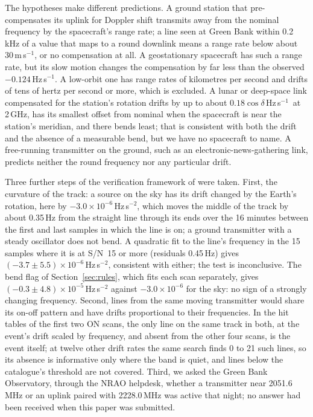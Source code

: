 \documentclass[twocolumn]{aastex631}
\newcommand{\hzs}{Hz\,s$^{-1}$}
\newcommand{\sn}{S/N}
\begin{document}
The hypotheses make different predictions. A ground station that
pre-compensates its uplink for Doppler shift transmits away from the
nominal frequency by the spacecraft's range rate; a line seen at Green Bank
within 0.2\,kHz of a value that maps to a round downlink means a range rate
below about 30\,m\,s$^{-1}$, or no compensation at all. A geostationary
spacecraft has such a range rate, but its slow motion changes the
compensation by far less than the observed $-0.124$\,\hzs. A low-orbit one
has range rates of kilometres per second and drifts of tens of hertz per
second or more, which is excluded. A lunar or deep-space link compensated
for the station's rotation drifts by up to about $0.18\cos\delta$\,\hzs\
at 2\,GHz, has its smallest offset from nominal when the spacecraft is near
the station's meridian, and there bends least; that is consistent with both
the drift and the absence of a measurable bend, but we have no spacecraft
to name. A free-running transmitter on the ground, such as an
electronic-news-gathering link, predicts neither the round frequency nor
any particular drift.

Three further steps of the verification framework of \citet{Sheikh2021}
were taken. First, the curvature of the track: a source on the sky has its
drift changed by the Earth's rotation, here by $-3.0\times10^{-6}$\,Hz\,s$^{-2}$,
which moves the middle of the track by about 0.35\,Hz from the straight
line through its ends over the 16 minutes between the first and last
samples in which the line is on; a ground transmitter with a steady
oscillator does not bend. A quadratic fit to the line's frequency in the 15
samples where it is at \sn\ 15 or more (residuals 0.45\,Hz) gives
$(-3.7\pm5.5)\times10^{-6}$\,Hz\,s$^{-2}$, consistent with either; the test
is inconclusive. The bend flag of Section~\ref{sec:rules}, which fits each
scan separately, gives $(-0.3\pm4.8)\times10^{-5}$\,Hz\,s$^{-2}$ against
$-3.0\times10^{-6}$ for the sky: no sign of a strongly changing frequency. Second, lines from the same moving transmitter would share
its on-off pattern and have drifts proportional to their frequencies. In
the hit tables of the first two ON scans, the only line on the same track
in both, at the event's drift scaled by frequency, and absent from the
other four scans, is the event itself; at twelve other drift rates the
same search finds 0 to 21 such lines, so its absence is informative only
where the band is quiet, and lines below the catalogue's threshold are not
covered. Third, we asked the Green Bank Observatory, through the NRAO
helpdesk, whether a transmitter near 2051.6\,MHz or an uplink paired with
2228.0\,MHz was active that night; no answer had been received when this
paper was submitted.
\end{document}
